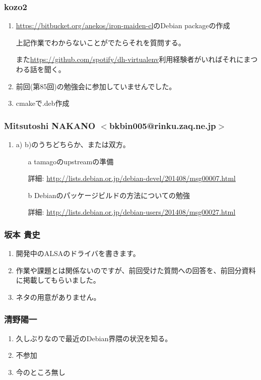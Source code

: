\documentclass[cjk,dvipdfmx,10pt,compress,%
hyperref={bookmarks=true,bookmarksnumbered=true,bookmarksopen=false,%
colorlinks=false,%
pdftitle={第 87 回 関西 Debian 勉強会},%
pdfauthor={倉敷・のがた・佐々木・かわだ・八津尾},%
pdfsubject={資料},%
}]{beamer}
\begin{document}
\begin{frame}
  \frametitle{ kozo2 }
  \begin{enumerate}
  \item
    \url{https://bitbucket.org/anekos/iron-maiden-cl}のDebian packageの作成

    上記作業でわからないことがでたらそれを質問する。

    また\url{https://github.com/spotify/dh-virtualenv}利用経験者がいればそれにまつわる話を聞く。
  \item 前回(第85回)の勉強会に参加していませんでした。
  \item cmakeで.deb作成
  \end{enumerate}
\end{frame}

\begin{frame}
  \frametitle{ Mitsutoshi NAKANO $<$bkbin005@rinku.zaq.ne.jp$>$ }
  \begin{enumerate}
  \item a) b)のうちどちらか、または双方。
    \begin{itemize}
    \item [a] tamagoのupstreamの準備

      詳細: \url{http://lists.debian.or.jp/debian-devel/201408/msg00007.html}
    \item [b]Debianのパッケージビルドの方法についての勉強

      詳細: \url{http://lists.debian.or.jp/debian-users/201408/msg00027.html}
    \end{itemize}
  \end{enumerate}
\end{frame}

\begin{frame}
  \frametitle{ 坂本 貴史 }
  \begin{enumerate}
  \item 開発中のALSAのドライバを書きます。
  \item 作業や課題とは関係ないのですが、前回受けた質問への回答を、前回分資料に掲載してもらいました。
  \item ネタの用意がありません。
  \end{enumerate}
\end{frame}

\begin{frame}
  \frametitle{  清野陽一 }
  \begin{enumerate}
  \item 久しぶりなので最近のDebian界隈の状況を知る。
  \item 不参加
  \item 今のところ無し
  \end{enumerate}
\end{frame}
\end{document}
